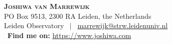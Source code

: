 \documentclass[letterpaper,12pt]{fed-res} %
\begin{document}
\begin{raggedleft}
    \textbf{\color{Maroon} \Huge \scshape Joshiwa van Marrewijk} \\ \vspace{1mm}
    {\small PO Box 9513, 2300 RA Leiden, the Netherlands \\
     Leiden Observatory \ $|$ \ \url{marrewijk@strw.leidenuniv.nl} \\ \ \textbf{Find me on:} \url{https://www.joshiwa.com}\\ }
\end{raggedleft}








% 







% 
\end{document}
